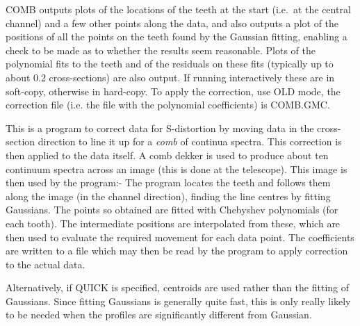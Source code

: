COMB outputs plots of the locations of the teeth at the start (i.e.\ at
the central channel) and a few other points along the data, and also
outputs a plot of the positions of all the points on the teeth found by
the Gaussian fitting, enabling a check to be made as to whether the
results seem reasonable.
Plots of the polynomial fits to the teeth and of the residuals on these
fits (typically up to about 0.2 cross-sections) are also output. If
running interactively these are in soft-copy, otherwise in hard-copy.
To apply the correction, use OLD mode, the correction file (i.e. the
file with the polynomial coefficients) is COMB.GMC.

This is a program to correct data for S-distortion by moving data in
the cross-section direction to line it up for a {\em comb} of continua
spectra. This correction is then applied to the data itself. A comb
dekker is used to produce about ten continuum spectra across an image
(this is done at the telescope). This image is then used by the
program:- The program locates the teeth and follows them along the
image (in the channel direction), finding the line centres by fitting
Gaussians. The points so obtained are fitted with Chebyshev polynomials
(for each tooth). The intermediate positions are interpolated from
these, which are then used to evaluate the required movement for each
data point. The coefficients are written to a file which may then be
read by the program to apply correction to the actual data. 

Alternatively, if QUICK is specified, centroids are used rather than
the fitting of Gaussians.
Since fitting Gaussians is generally quite fast, this is only really
likely to be needed when the profiles are significantly different from
Gaussian.

